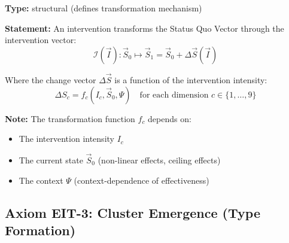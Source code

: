 \begin{tcolorbox}[colback=blue!5!white, colframe=blue!75!black,
    title=\textbf{Axiom EIT-2: Intervention as 10C Transformation}]

\textbf{Type:} structural (defines transformation mechanism)

\textbf{Statement:} An intervention transforms the Status Quo Vector through the intervention vector:
\begin{equation}
\boxed{\mathcal{I}(\vec{I}): \vec{S}_0 \mapsto \vec{S}_1 = \vec{S}_0 + \Delta\vec{S}(\vec{I})}
\label{eq:ie-transformation}
\end{equation}

Where the change vector $\Delta\vec{S}$ is a function of the intervention intensity:
\begin{equation}
\Delta S_c = f_c(I_c, \vec{S}_0, \Psi) \quad \text{for each dimension } c \in \{1, \ldots, 9\}
\end{equation}

\textbf{Note:} The transformation function $f_c$ depends on:
\begin{itemize}[nosep]
    \item The intervention intensity $I_c$
    \item The current state $\vec{S}_0$ (non-linear effects, ceiling effects)
    \item The context $\Psi$ (context-dependence of effectiveness)
\end{itemize}
\end{tcolorbox}

\subsection{Axiom EIT-3: Cluster Emergence (Type Formation)}
\label{sec:ie-axiom-3}

